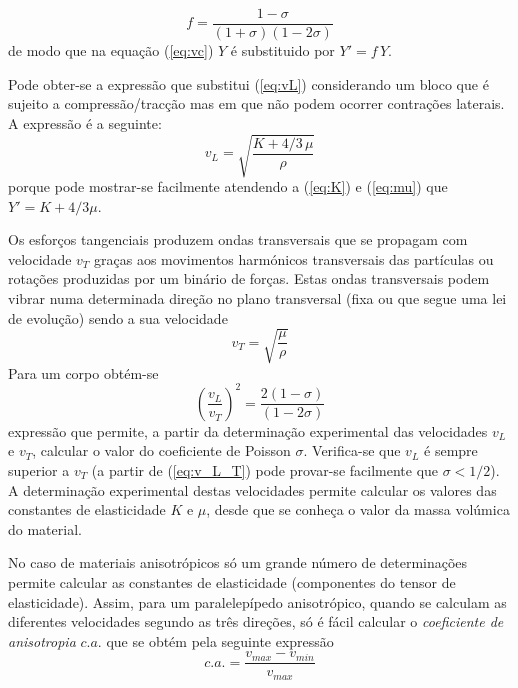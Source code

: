 \documentclass[a4paper,12pt]{article}
\begin{document}
\begin{equation}
	\label{eq:f}
	f = \frac{1-\sigma}{(1+\sigma)(1-2\sigma)} 
\end{equation}
de modo que na equação (\ref{eq:vc}) $Y$ é substituido por $Y'=f\,Y$.

Pode obter-se a expressão que substitui (\ref{eq:vL})  considerando um bloco que é sujeito a compressão/tracção mas em que não podem ocorrer contrações laterais. A expressão é a seguinte:
\begin{equation}
	\label{eq:vL2}
	 v_L = \sqrt{\frac{K + 4/3\,\mu}{\rho}}
\end{equation}
porque pode mostrar-se facilmente atendendo a (\ref{eq:K}) e (\ref{eq:mu}) que  $Y'=K + 4/3\mu$.

Os esforços tangenciais produzem ondas transversais que se propagam com velocidade $v_T$ graças aos movimentos harmónicos transversais das partículas ou rotações produzidas por um binário de forças. Estas ondas transversais podem vibrar numa determinada direção no plano transversal (fixa ou que segue uma lei de evolução) sendo a sua velocidade
\begin{equation}
	\label{eq:vT}
	 v_T = \sqrt{\frac{\mu}{\rho}}
\end{equation}
Para um corpo obtém-se
\begin{equation}
	\label{eq:v_L_T}
	\left(\frac{v_L}{v_T}\right)^2 =  \frac{2(1-\sigma)}{(1-2\sigma)} 
\end{equation}
expressão que permite, a partir da determinação experimental das velocidades $v_L$ e $v_T$, calcular o valor do coeficiente de Poisson $\sigma$. Verifica-se que $v_L$ é sempre superior a $v_T$  (a partir de (\ref{eq:v_L_T}) pode provar-se facilmente que $\sigma<1/2$).
A determinação experimental destas velocidades permite calcular os valores das constantes de elasticidade $K$ e $\mu$, desde que se conheça o valor da massa volúmica do material.

No caso de materiais anisotrópicos só um grande número de determinações permite calcular as constantes de elasticidade (componentes do tensor de elasticidade). Assim, para um paralelepípedo anisotrópico, quando se calculam as diferentes velocidades segundo as três direções, só é fácil calcular o \emph{coeficiente de anisotropia} $c.a.$ que se obtém pela seguinte expressão
\begin{equation}
	\label{eq:ca}
	c.a.= \frac{v_{max}-v_{min}}{v_{max}}
\end{equation}
\end{document}
